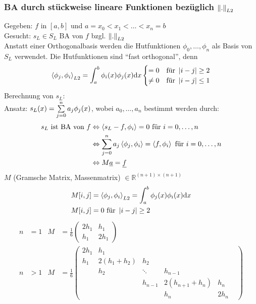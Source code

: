 \subsubsection{BA durch stückweise lineare Funktionen bezüglich $\left\lVert . \right\rVert_{L2}$}
Gegeben: $f$ in $[a,b]$ und $a=x_0<x_1<\ldots<x_n=b$\\
Gesucht: $s_L \in S_L$ BA von $f$ bzgl. $\left\lVert . \right\rVert_{L2}$\\
Anstatt einer Orthogonalbasis werden die Hutfunktionen $\phi_0,\ldots,\phi_n$ als Basis von $S_L$ verwendet.
Die Hutfunktionen sind ``fast orthogonal'', denn
\begin{align*}
  \left\langle \phi_j, \phi_i \right\rangle_{L2} = \int_a^b \phi_i(x)\phi_j(x)\mathrm{d}x\begin{cases}
    =0 &\mbox{für } \left| i-j \right| \geq 2\\
    \neq0 &\mbox{für } \left| i-j \right| \leq 1\\
  \end{cases}
\end{align*}
Berechnung von $s_L$:\\
Ansatz: $s_L(x)=\sum\limits_{j=0}^{n}{a_j \phi_j(x)}$, wobei $a_0,\ldots,a_n$ bestimmt werden durch:
\begin{align*}
  s_L \mbox{ ist BA von } f &\Leftrightarrow \left\langle s_L - f, \phi_i \right\rangle = 0 \mbox{ für } i=0,\ldots,n\\
  &\Leftrightarrow \sum\limits_{j=0}^{n}{a_j\left\langle \phi_j, \phi_i \right\rangle} = \left\langle f, \phi_i \right\rangle\mbox{ für } i=0,\ldots,n\\
  &\Leftrightarrow M \underline{a} = \underline{f}
\end{align*}
$M$ (Gramsche Matrix, Massenmatrix) $\in \mathbb{R}^{(n+1)\times(n+1)}$
\begin{align*}
  M[i,j] &= \left\langle \phi_j, \phi_i \right\rangle_{L2} = \int_a^b \phi_j(x)\phi_i(x) \mathrm{d}x\\
  M[i,j] &= 0 \mbox{ für } \left| i-j \right| \geq 2
\end{align*}
\begin{align*}
  n &= 1 & M &= \frac{1}{6}\begin{pmatrix}
    2h_1 & h_1\\
    h_1 & 2h_1
  \end{pmatrix}\\
  n &> 1 & M &= \frac{1}{6}\begin{pmatrix}
		      2 h_1   & h_1 &        &          & &  \\
					h_1     & 2(h_1+h_2)   & h_2      & &  \\
                  & h_2          & \ddots   & h_{n-1} & \\
                  &              &  h_{n-1} & 2(h_{n+1}+h_n)  & h_n \\
									&              &  & h_n   & 2 h_n
		      \end{pmatrix}
\end{align*}
